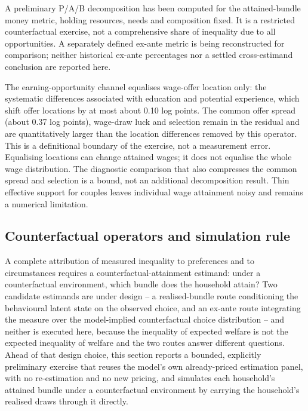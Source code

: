 \documentclass[11pt,a4paper]{article}
\begin{document}
A preliminary P/A/B decomposition has been computed for the attained-bundle money metric, holding resources, needs and composition fixed. It is a restricted counterfactual exercise, not a comprehensive share of inequality due to all opportunities. A separately defined ex-ante metric is being reconstructed for comparison; neither historical ex-ante percentages nor a settled cross-estimand conclusion are reported here.

The earning-opportunity channel equalises wage-offer location only: the systematic differences associated with education and potential experience, which shift offer locations by at most about 0.10 log points. The common offer spread (about 0.37 log points), wage-draw luck and selection remain in the residual and are quantitatively larger than the location differences removed by this operator. This is a definitional boundary of the exercise, not a measurement error. Equalising locations can change attained wages; it does not equalise the whole wage distribution. The diagnostic comparison that also compresses the common spread and selection is a bound, not an additional decomposition result. Thin effective support for couples leaves individual wage attainment noisy and remains a numerical limitation.

\subsection{Counterfactual operators and simulation rule}\label{counterfactual-operators-and-simulation-rule}

A complete attribution of measured inequality to preferences and to circumstances requires a counterfactual-attainment estimand: under a counterfactual environment, which bundle does the household attain? Two candidate estimands are under design -- a realised-bundle route conditioning the behavioural latent state on the observed choice, and an ex-ante route integrating the measure over the model-implied counterfactual choice distribution -- and neither is executed here, because the inequality of expected welfare is not the expected inequality of welfare and the two routes answer different questions. Ahead of that design choice, this section reports a bounded, explicitly preliminary exercise that reuses the model's own already-priced estimation panel, with no re-estimation and no new pricing, and simulates each household's attained bundle under a counterfactual environment by carrying the household's realised draws through it directly.
\end{document}
